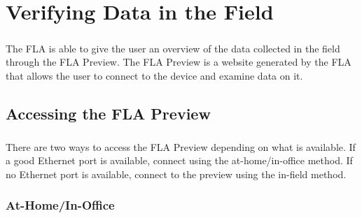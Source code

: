 \documentclass[11pt, oneside]{book}
\begin{document}
\chapter{Verifying Data in the Field}
\paragraph{  }
The FLA is able to give the user an overview of the data collected in the field through the FLA Preview. The FLA Preview is a website generated by the FLA that allows the user to connect to the device and examine data on it.
\section{Accessing the FLA Preview}
\paragraph{  }
There are two ways to access the FLA Preview depending on what is available. If a good Ethernet port is available, connect using the at-home/in-office method. If no Ethernet port is available, connect to the preview using the in-field method.
\subsection{At-Home/In-Office}
\end{document}
